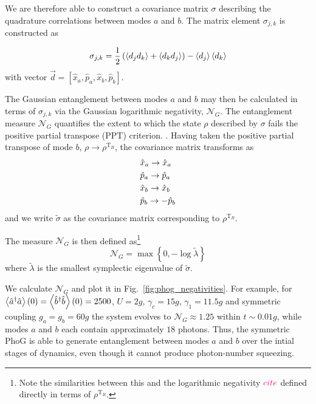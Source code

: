 \noindent We are therefore able to construct a covariance matrix $\sigma$  describing the quadrature correlations between modes $a$ and $b$. The matrix element $\sigma_{j, k}$ is constructed as 

\begin{equation}\label{eqn:covariance matrix}
\sigma_{j, k} = \frac{1}{2} \left( \ev{d_j d_k} + \ev{d_k d_j}\right) - \ev{d_j} \ev{d_k}
\end{equation}
with vector $\overrightarrow{d} = \left[\hat{x}_a, \hat{p}_a, \hat{x}_b, \hat{p}_b \right]$.

The Gaussian entanglement between modes $a$ and $b$ may then be calculated in terms of $\sigma_{j, k}$ via the Gaussian logarithmic negativity, $\mathcal{N}_G$. The entanglement measure $\mathcal{N}_G$ quantifies the extent to which the state $\rho$ described by $\sigma$ fails the positive partial transpose (PPT) criterion. . Having taken the positive partial transpose of mode $b$, $\rho \rightarrow \rho^{\text{T}_B}$, the covariance matrix transforms as 
\begin{align}
&\hat{x}_a \rightarrow \hat{x}_a \notag \\
%
&\hat{p}_a \rightarrow \hat{p}_a \notag \\
%
&\hat{x}_b \rightarrow \hat{x}_b \notag \\
%
&\hat{p}_b \rightarrow - \hat{p}_b \notag
\end{align}
and we write $\tilde{\sigma}$ as the covariance matrix corresponding to $\rho^{\text{T}_B}$.

\noindent The measure $\mathcal{N}_G$ is then defined as\footnote{Note the similarities between this and the logarithmic negativity $\textcolor{magenta}{cite}$ defined directly in terms of $\rho^{\text{T}_B}$.}
\begin{equation}
\mathcal{N}_G = \max\left\{0, - \log \tilde{\lambda} \right\}
\end{equation}
where $\tilde{\lambda}$ is the smallest symplectic eigenvalue of $\tilde{\sigma}$. 

We calculate $\mathcal{N}_G$ and plot it in Fig.~\ref{fig:phog_negativities}. For example, for $\ev{\hat{a}^\dagger \hat{a}}\left(0\right) = \ev{\hat{b}^\dagger \hat{b}}\left(0\right) = 2500$, $U = 2 g$, $\gamma_c = 15 g$, $\gamma_1 = 11.5 g$ and symmetric coupling $g_a = g_b = 60 g$ the system evolves to $\mathcal{N}_G \approx 1.25$ within $t \sim 0.01 g$, while modes $a$ and $b$ each contain approximately $18$ photons.  Thus, the symmetric PhoG is able to generate entanglement between modes $a$ and $b$ over the intial stages of dynamics, even though it cannot produce photon-number squeezing. 


